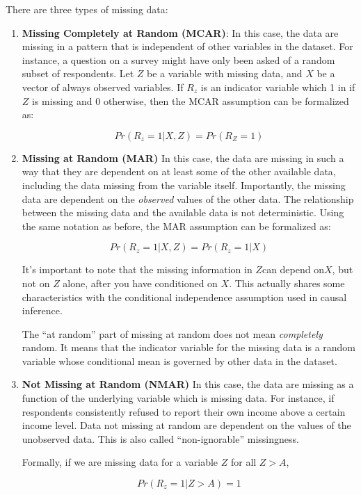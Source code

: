 \documentclass[12 pt]{article}
\begin{document}
There are three types of missing data:
\begin{enumerate}
\item \textbf{Missing Completely at Random (MCAR)}: In this case, the
  data are missing in a pattern that is independent of other variables
  in the dataset. For instance, a question on a survey might have only
  been asked of a random subset of respondents. Let $Z$ be a variable
  with missing data, and $X$ be a vector of always observed
  variables. If $R_z$ is an indicator variable which 1 in if $Z$ is
  missing and 0 otherwise, then the MCAR assumption can be formalized
  as:

  \begin{equation*}
    Pr(R_z=1|X,Z)=Pr(R_Z=1)
  \end{equation*}


\item \textbf{Missing at Random (MAR)} In this case, the data are
  missing in such a way that they are dependent on at least some of
  the other available data, including the data missing from the
  variable itself. Importantly, the missing data are dependent on the
  \textit{observed} values of the other data. The relationship between
  the missing data and the available data is not deterministic. Using
  the same notation as before, the MAR assumption can be formalized
  as:

  \begin{equation*}
    Pr(R_z=1|X,Z)=Pr(R_z=1|X)
  \end{equation*}

It's important to note that the missing information in $Z $can depend
on$X$, but not on $Z$ alone, after you have conditioned on $X$. This
actually shares some characteristics with the conditional independence
assumption used in causal inference. 

The ``at random'' part of missing at random does not mean
\textit{completely} random. It means that the indicator variable for
the missing data is a random variable whose conditional mean is
governed by other data in the dataset. 

\item \textbf{Not Missing at Random (NMAR) } In this case, the data are
  missing as a function of the underlying variable which is missing data. For instance, if
  respondents consistently refused to report their own income above a certain
  income level. Data not missing at random are dependent on the values
  of the unobserved data. This is also called ``non-ignorable''
  missingness. 

Formally, if we are missing data for a variable $Z$ for all $Z>A$,

\begin{equation*}
  Pr(R_z=1|Z>A)=1
\end{equation*}

\end{enumerate}
\end{document}
